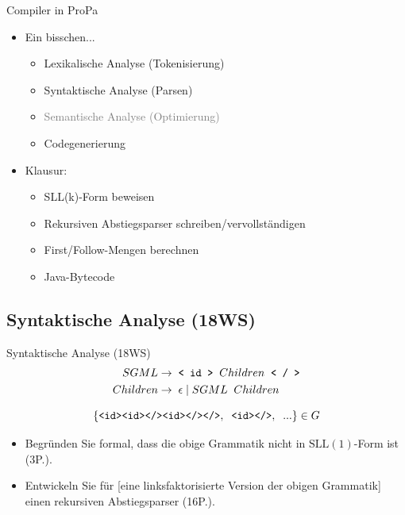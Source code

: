 \documentclass{beamer}
\begin{document}
\begin{frame}{Compiler in ProPa}
	\begin{itemize}
		\item Ein bisschen...
		\begin{itemize}
			\item Lexikalische Analyse (Tokenisierung)
			\item Syntaktische Analyse (Parsen)
			\item \textcolor{gray}{Semantische Analyse (Optimierung)}
			\item Codegenerierung
		\end{itemize}
		\pause
		\item Klausur:
		\begin{itemize}
			\item SLL(k)-Form beweisen
			\item Rekursiven Abstiegsparser schreiben/vervollständigen
			\item First/Follow-Mengen berechnen
			\item Java-Bytecode
		\end{itemize}
	\end{itemize}
\end{frame}

\subsection{Syntaktische Analyse (18WS)}

\begin{frame}{Syntaktische Analyse (18WS)}
	\begin{align*}
		SGML \to & \;\; \textrm{\texttt{< id >}} \;\; Children \;\; \textrm{\texttt{< / >}}\\
		Children \to & \;\; \epsilon \mid SGML \;\; Children
	\end{align*}

	\begin{equation*}
		\{\textrm{\texttt{<id><id></><id></></>}},\;\;\textrm{\texttt{<id></>}},\;\;...\} \in G
	\end{equation*}

	\pause
	\begin{itemize}
		\item Begründen Sie formal, dass die obige Grammatik nicht in $\textrm{SLL}(1)$-Form ist (3P.).
		\pause
		\item Entwickeln Sie für [eine linksfaktorisierte Version der obigen Grammatik] einen rekursiven Abstiegsparser (16P.).
	\end{itemize}
\end{frame}
\end{document}

